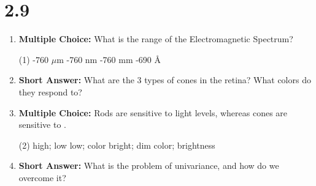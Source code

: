 \squigglyline


\section*{2.9}

\begin{enumerate}[label=\textbf{Q2.9.\arabic*}]
      \item \textbf{Multiple Choice:} What is the range of the Electromagnetic Spectrum?
            \begin{tasks}[label=\textcolor{\documentTheme}{(\Alph*)}, item-format=\color{\documentTheme}, label-width=1.5em, item-indent=1.7em](1)
                  -760 \(\mu\)m
                  -760 nm
                  -760 mm
                  -690 \AA
            \end{tasks}

      \item \textbf{Short Answer:} What are the 3 types of cones in the retina? What colors do they respond to? \\

      \item \textbf{Multiple Choice:} Rods are sensitive to \underline{\hspace{3cm}} light levels, whereas cones are sensitive to \underline{\hspace{3cm}}. 
            \begin{tasks}[label=\textcolor{\documentTheme}{(\Alph*)}, item-format=\color{\documentTheme}, label-width=1.5em, item-indent=1.7em](2)
                  \task high; low
                  \task low; color
                  \task bright; dim
                  \task color; brightness
            \end{tasks}

      \item \textbf{Short Answer:} What is the problem of univariance, and how do we overcome it? \\


\end{enumerate}
